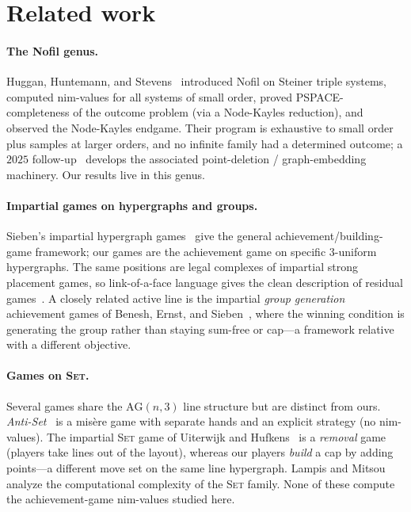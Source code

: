 \documentclass[11pt]{article}
\theoremstyle{plain}
\theoremstyle{definition}
\theoremstyle{remark}
\newcommand{\AG}{\mathrm{AG}}
\begin{document}
\section{Related work}
\label{sec:related}

\paragraph{The Nofil genus.} Huggan, Huntemann, and Stevens~\cite{huggan2022nofil} introduced Nofil
on Steiner triple systems, computed nim-values for all systems of small order, proved
PSPACE-completeness of the outcome problem (via a Node-Kayles reduction), and observed the
Node-Kayles endgame. Their program is exhaustive to small order plus samples at larger orders, and
no infinite family had a determined outcome; a $2025$ follow-up~\cite{huntemann2025minimal} develops
the associated point-deletion / graph-embedding machinery. Our results live in this genus.

\paragraph{Impartial games on hypergraphs and groups.} Sieben's impartial hypergraph
games~\cite{sieben2023hypergraph} give the general achievement/building-game framework; our games
are the achievement game on specific $3$-uniform hypergraphs. The same positions are legal
complexes of impartial strong placement games, so link-of-a-face language gives the clean
description of residual games~\cite{faridi2019gamecomplexes,huntemann2019strongplacement}. A
closely related active line is the
impartial \emph{group generation} achievement games of Benesh, Ernst, and
Sieben~\cite{benesh2016symmetric,benesh2018nilpotent}, where the winning condition is generating the
group rather than staying sum-free or cap---a framework relative with a different objective.

\paragraph{Games on \textsc{Set}.} Several games share the $\AG(n,3)$ line structure but are distinct
from ours. \emph{Anti-Set}~\cite{clark2016antiset} is a mis\`ere game with separate hands and an
explicit strategy (no nim-values). The impartial \textsc{Set} game of Uiterwijk and
Hufkens~\cite{uiterwijk2023impartialset} is a \emph{removal} game (players take lines out of the
layout), whereas our players \emph{build} a cap by adding points---a different move set on the same
line hypergraph. Lampis and Mitsou~\cite{lampis2014setcomplexity} analyze the computational
complexity of the \textsc{Set} family. None of these compute the achievement-game nim-values studied
here.
\end{document}
